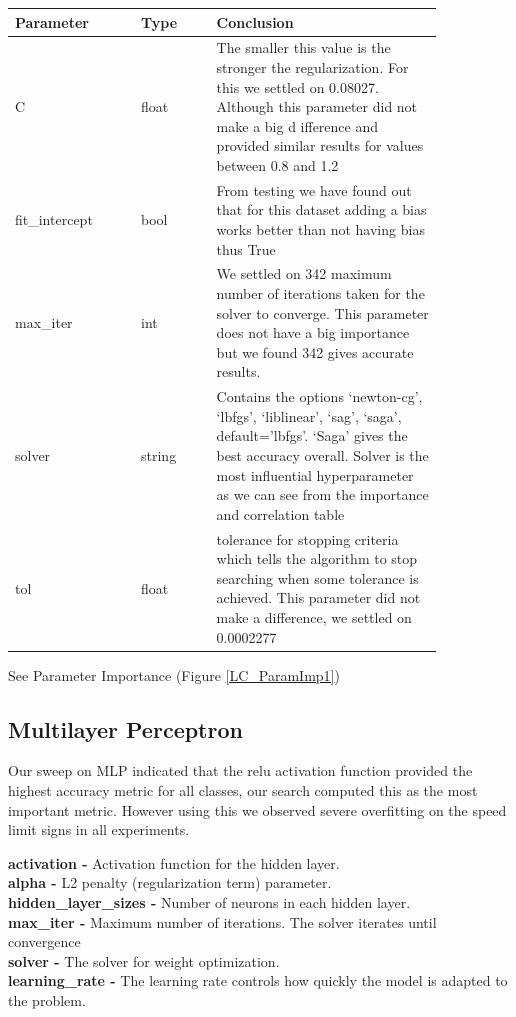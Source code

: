 \documentclass[11pt]{article}
\begin{document}
\begin{table}[ht]
  \centering
  \begin{tabular}{|p{0.25\linewidth} | p{0.15 \linewidth} | p{0.45\linewidth}|} 
    \hline
    \textbf{Parameter} & \textbf{Type} & \textbf{Conclusion} \\ \hline
    C & float & The smaller this value is the stronger the regularization. For this we settled on 0.08027. Although this parameter did not make a big d ifference and provided similar results for values between 0.8 and 1.2 \\ \hline
    fit\_intercept & bool & From testing we have found out that for this dataset adding a bias works better than not having bias thus True  \\ \hline
    max\_iter & int &  We settled on 342 maximum number of iterations taken for the solver to converge. This parameter does not have a big importance but we found 342 gives accurate results. \\ \hline
    solver & string & Contains the options ‘newton-cg’, ‘lbfgs’, ‘liblinear’, ‘sag’, ‘saga’, default=’lbfgs’. ‘Saga’ gives the best accuracy overall. Solver is the most influential hyperparameter as we can see from the importance and correlation table \\ \hline
    tol & float & tolerance for stopping criteria which tells the algorithm to stop searching when some tolerance is achieved. This parameter did not make a difference, we settled on 0.0002277 \\ \hline


  \end{tabular}
\end{table}\label{LC_Analysis_Table}
See Parameter Importance (Figure \ref{LC_ParamImp1})

\newpage
\subsection{Multilayer Perceptron}
\cite{SklearnNeuralNetwork}
\par
\label{MLPSection}
Our sweep on MLP indicated that the relu activation function provided the highest accuracy metric for all classes, our search computed this as the most important metric.
However using this we observed severe overfitting on the speed limit signs in all experiments.

\textbf{activation -} Activation function for the hidden layer. \\
\textbf{alpha -} L2 penalty (regularization term) parameter. \\
\textbf{hidden\_layer\_sizes -} Number of neurons in each hidden layer. \\
\textbf{max\_iter -} Maximum number of iterations. The solver iterates until convergence \\
\textbf{solver -} The solver for weight optimization.\\
\textbf{learning\_rate -} The learning rate controls how quickly the model is adapted to the problem. \\
\end{document}
